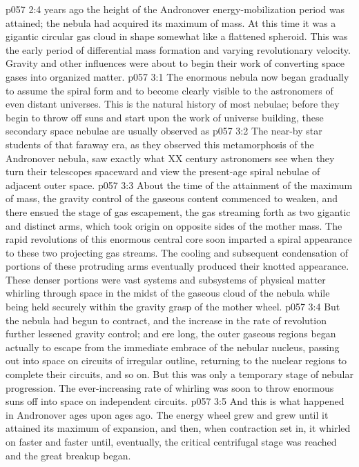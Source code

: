 \vs p057 2:4 \pc {} years ago the height of the Andronover energy\hyp{}mobilization period was attained; the nebula had acquired its maximum of mass. At this time it was a gigantic circular gas cloud in shape somewhat like a flattened spheroid. This was the early period of differential mass formation and varying revolutionary velocity. Gravity and other influences were about to begin their work of converting space gases into organized matter.
\vs p057 3:1 The enormous nebula now began gradually to assume the spiral form and to become clearly visible to the astronomers of even distant universes. This is the natural history of most nebulae; before they begin to throw off suns and start upon the work of universe building, these secondary space nebulae are usually observed as 
\vs p057 3:2 The near-by star students of that faraway era, as they observed this metamorphosis of the Andronover nebula, saw exactly what XX century astronomers see when they turn their telescopes spaceward and view the present\hyp{}age spiral nebulae of adjacent outer space.
\vs p057 3:3 About the time of the attainment of the maximum of mass, the gravity control of the gaseous content commenced to weaken, and there ensued the stage of gas escapement, the gas streaming forth as two gigantic and distinct arms, which took origin on opposite sides of the mother mass. The rapid revolutions of this enormous central core soon imparted a spiral appearance to these two projecting gas streams. The cooling and subsequent condensation of portions of these protruding arms eventually produced their knotted appearance. These denser portions were vast systems and subsystems of physical matter whirling through space in the midst of the gaseous cloud of the nebula while being held securely within the gravity grasp of the mother wheel.
\vs p057 3:4 But the nebula had begun to contract, and the increase in the rate of revolution further lessened gravity control; and ere long, the outer gaseous regions began actually to escape from the immediate embrace of the nebular nucleus, passing out into space on circuits of irregular outline, returning to the nuclear regions to complete their circuits, and so on. But this was only a temporary stage of nebular progression. The ever\hyp{}increasing rate of whirling was soon to throw enormous suns off into space on independent circuits.
\vs p057 3:5 And this is what happened in Andronover ages upon ages ago. The energy wheel grew and grew until it attained its maximum of expansion, and then, when contraction set in, it whirled on faster and faster until, eventually, the critical centrifugal stage was reached and the great breakup began.
